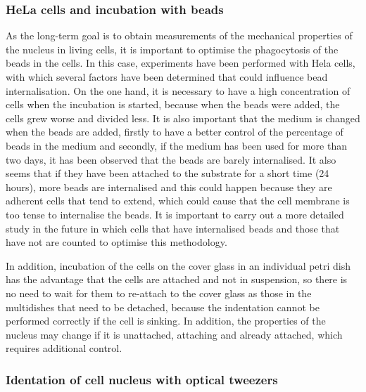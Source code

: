 \documentclass[12pt, a4paper]{article} %
\begin{document}
\subsubsection{HeLa cells and incubation with beads}

\setlength{\parskip}{0mm}

As the long-term goal is to obtain measurements of the mechanical properties of the nucleus in living cells, it is important to optimise the phagocytosis of the beads in the cells. In this case, experiments have been performed with Hela cells, with which several factors have been determined that could influence bead internalisation. On the one hand, it is necessary to have a high concentration of cells when the incubation is started, because when the beads were added, the cells grew worse and divided less. It is also important that the medium is changed when the beads are added, firstly to have a better control of the percentage of beads in the medium and secondly, if the medium has been used for more than two days, it has been observed that the beads are barely internalised. It also seems that if they have been attached to the substrate for a short time (24 hours), more beads are internalised and this could happen because they are adherent cells that tend to extend, which could cause that the cell membrane is too tense to internalise the beads. It is important to carry out a more detailed study in the future in which cells that have internalised beads and those that have not are counted to optimise this methodology.

\setlength{\parskip}{4mm}

In addition, incubation of the cells on the cover glass in an individual petri dish has the advantage that the cells are attached and not in suspension, so there is no need to wait for them to re-attach to the cover glass as those in the multidishes that need to be detached, because the indentation cannot be performed correctly if the cell is sinking. In addition, the properties of the nucleus may change if it is unattached, attaching and already attached, which requires additional control.

\subsubsection{Identation of cell nucleus with optical tweezers}
\end{document}
